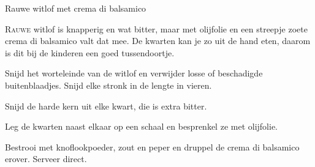 \begin{recipe}{Rauwe witlof met crema di balsamico}
\label{recipe:rauwe-witlof-balsamico}


\lettrine{R}{auwe} witlof is knapperig en wat bitter, maar met olijfolie en een
streepje zoete crema di balsamico valt dat mee. De kwarten kan je zo uit de hand
eten, daarom is dit bij de kinderen een goed tussendoortje.

\begin{ingredients}
\end{ingredients}

\begin{steps}
  \item Snijd het worteleinde van de witlof en verwijder losse of beschadigde
        buitenblaadjes. Snijd elke stronk in de lengte in vieren.
  \item Snijd de harde kern uit elke kwart, die is extra bitter.
  \item Leg de kwarten naast elkaar op een schaal en besprenkel ze met olijfolie.
  \item Bestrooi met knoflookpoeder, zout en peper en druppel de crema di
        balsamico erover. Serveer direct.
\end{steps}
\end{recipe}

